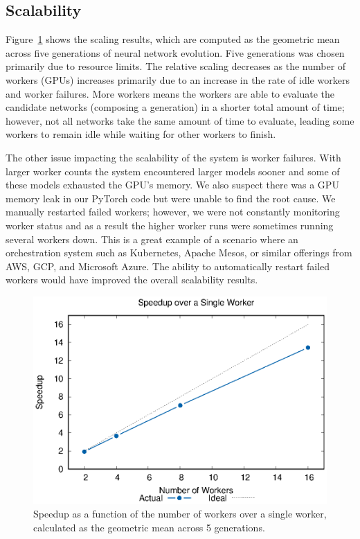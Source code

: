 \documentclass[conference]{IEEEtran}
\begin{document}
\subsection{Scalability}
Figure~\ref{fig:scale} shows the scaling results, which are computed as the
geometric mean across five generations of neural network evolution. Five
generations was chosen primarily due to resource limits. The relative scaling
decreases as the number of workers (GPUs) increases primarily due to an
increase in the rate of idle workers and worker failures. More workers
means the workers are able to evaluate the candidate networks (composing a
generation) in a shorter total amount of time; however, not all networks
take the same amount of time to evaluate, leading some workers to remain
idle while waiting for other workers to finish.

The other issue impacting the scalability of the system is worker
failures. With larger worker counts the system encountered larger models
sooner and some of these models exhausted the GPU's memory. We also
suspect there was a GPU memory leak in our PyTorch code but were unable
to find the root cause. We manually restarted failed workers; however,
we were not constantly monitoring worker status and as a result the higher
worker runs were sometimes running several workers down. This is a great
example of a scenario where an orchestration system such as Kubernetes,
Apache Mesos, or similar offerings from AWS, GCP, and Microsoft Azure.
The ability to automatically restart failed workers would have improved
the overall scalability results.

\begin{figure}
  \centering
  \includegraphics[width=\columnwidth]{result/output/rates}
  \caption{Speedup as a function of the number of workers over a single worker,
    calculated as the geometric mean across 5 generations.}
  \label{fig:scale}
\end{figure}
\end{document}
